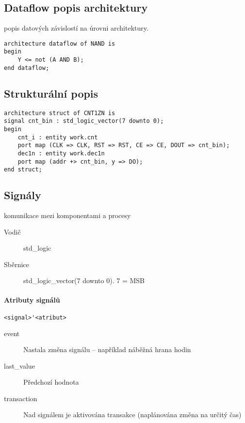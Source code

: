 \documentclass[a4wide]{report}
\begin{document}
\subsection{Dataflow popis architektury}

popis datových závislostí na úrovni architektury.

\begin{lstlisting}
architecture dataflow of NAND is
begin
	Y <= not (A AND B);
end dataflow;
\end{lstlisting}

\subsection{Strukturální popis}

\begin{lstlisting}
architecture struct of CNT1ZN is
signal cnt_bin : std_logic_vector(7 downto 0);
begin
	cnt_i : entity work.cnt
	port map (CLK => CLK, RST => RST, CE => CE, DOUT => cnt_bin);
	dec1n : entity work.dec1n
	port map (addr +> cnt_bin, y => DO);
end struct;
\end{lstlisting}

\subsection{Signály}

komunikace mezi komponentami a procesy

\begin{description}
	\item[Vodič] std\_logic
	\item[Sběrnice] std\_logic\_vector(7 downto 0). 7 = MSB
\end{description}

\paragraph{Atributy signálů}

\verb|<signal>'<atribut>|

\begin{description}
	\item[event] Nastala změna signálu -- například náběžná hrana hodin
	\item[last\_value] Předchozí hodnota
	\item[transaction] Nad signálem je aktivována transakce (naplánována změna na určitý čas)
\end{description}
\end{document}
